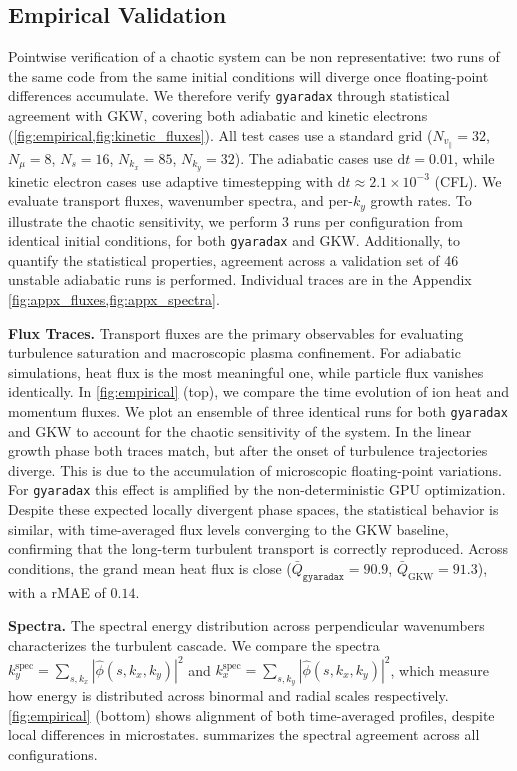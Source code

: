 \documentclass{article}
\theoremstyle{plain}
\theoremstyle{definition}
\theoremstyle{remark}
\begin{document}
\subsection{Empirical Validation}
\label{sec:verification}
Pointwise verification of a chaotic system can be non representative: two runs of the same code from the same initial conditions will diverge once floating-point differences accumulate.
%
We therefore verify \texttt{gyaradax} through statistical agreement with GKW, covering both adiabatic \cite{paischer2025gyroswin} and kinetic electrons (\cref{fig:empirical,fig:kinetic_fluxes}).
%
All test cases use a standard grid ($N_{v_{\parallel}} = 32$, $N_\mu = 8$, $N_s = 16$, $N_{k_x} = 85$, $N_{k_y} = 32$).
The adiabatic cases use $\textrm{d}t = 0.01$, while kinetic electron cases use adaptive timestepping with $\textrm{d}t \approx 2.1 \times 10^{-3}$ (CFL).
We evaluate transport fluxes, wavenumber spectra, and per-$k_y$ growth rates.
%
To illustrate the chaotic sensitivity, we perform 3 runs per configuration from identical initial conditions, for both \texttt{gyaradax} and GKW.
%
Additionally, to quantify the statistical properties, agreement across a validation set of 46 unstable adiabatic runs is performed. Individual traces are in the Appendix \cref{fig:appx_fluxes,fig:appx_spectra}.

\textbf{Flux Traces.}
Transport fluxes are the primary observables for evaluating turbulence saturation and macroscopic plasma confinement.
%
For adiabatic simulations, heat flux is the most meaningful one, while particle flux vanishes identically.
%
In \cref{fig:empirical} (top), we compare the time evolution of ion heat and momentum fluxes. We plot an ensemble of three identical runs for both \texttt{gyaradax} and GKW to account for the chaotic sensitivity of the system.
%
In the linear growth phase both traces match, but after the onset of turbulence trajectories diverge. This is due to the accumulation of microscopic floating-point variations. For \texttt{gyaradax} this effect is amplified by the non-deterministic GPU optimization.
%
Despite these expected locally divergent phase spaces, the statistical behavior is similar, with time-averaged flux levels converging to the GKW baseline, confirming that the long-term turbulent transport is correctly reproduced.
%
Across conditions, the grand mean heat flux is close ($\bar{Q}_\texttt{gyaradax} = 90.9$, $\bar{Q}_\text{GKW} = 91.3$), with a rMAE of $0.14$.

\textbf{Spectra.}
The spectral energy distribution across perpendicular wavenumbers characterizes the turbulent cascade.
We compare the spectra $k_y^{\text{spec}} = \sum_{s, k_x} |\hat{\phi}(s, k_x, k_y)|^2$ and $k_x^{\text{spec}} = \sum_{s, k_y} |\hat{\phi}(s, k_x, k_y)|^2$, which measure how energy is distributed across binormal and radial scales respectively.
\cref{fig:empirical} (bottom) shows alignment of both time-averaged profiles, despite local differences in microstates.
 summarizes the spectral agreement across all configurations.
\end{document}
